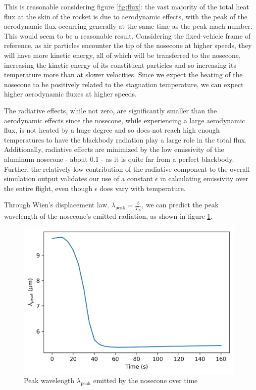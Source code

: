 \documentclass[twocolumn]{article}
\begin{document}
            This is reasonable considering figure \ref{fig:flux}: the vast majority of the 
            total heat flux at the skin of the rocket is due to aerodynamic
            effects, with the peak of the aerodynamic flux occurring generally at 
            the same time as the peak mach number. This would seem to be a
            reasonable result. Considering the fixed-vehicle frame of reference,
            as air particles encounter the tip of the nosecone at higher speeds, 
            they will have more kinetic energy, all of which will be transferred 
            to the nosecone, increasing the kinetic energy of its constituent 
            particles and so increasing its temperature more than at slower
            velocities. Since we expect the heating of the nosecone to be 
            positively related to the stagnation temperature, we can expect
            higher aerodynamic fluxes at higher speeds. 

            The radiative effects, while not zero, are significantly smaller
            than the aerodynamic effects since the nosecone, while experiencing 
            a large aerodynamic flux, is not heated by a huge degree and so
            does not reach high enough temperatures to have the blackbody 
            radiation play a large role in the total flux.
            Additionally, radiative effects are minimized by the low emissivity 
            of the aluminum nosecone - about 0.1 - as it is quite far from a 
            perfect blackbody. Further, the relatively low contribution of the 
            radiative component to the overall simulation output validates 
            our use of a constant $\epsilon$ in calculating emissivity over the 
            entire flight, even though $\epsilon$ does vary with temperature. 

            Through Wien's displacement law, $\lambda_{\textrm{peak}}= \frac{b}{T_N}$, 
            we can predict the peak wavelength of the nosecone's emitted 
            radiation, as shown in figure \ref{fig:lambda}.

            \begin{figure}[h]
                \includegraphics[width=\linewidth]{wavelength.png}
                \caption{Peak wavelength $\lambda_\textrm{peak}$ emitted by the
                nosecone over time}
                \label{fig:lambda}
            \end{figure}
\end{document}
